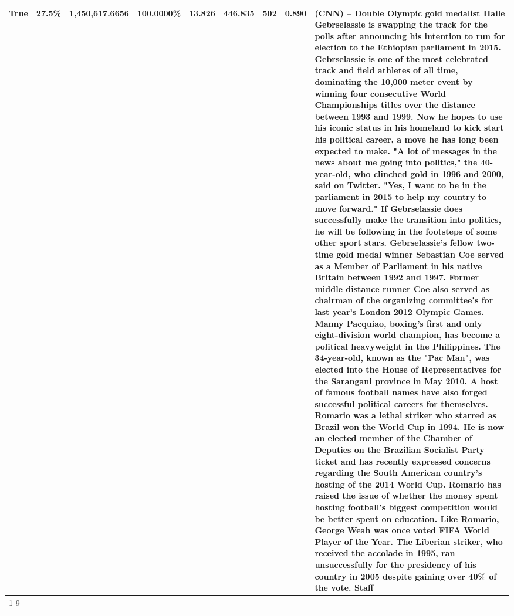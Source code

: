 \begin{table}[H]
{\begin{tabular}{lllrlllll}
True & 27.5\% & 1,450,617.6656 & \bfseries \color{red} 100.0000\% & 13.826 & 446.835 & 502 & 0.890 & (CNN) -- Double Olympic gold medalist Haile Gebrselassie is swapping the track for the polls after announcing his intention to run for election to the Ethiopian parliament in 2015. Gebrselassie is one of the most celebrated track and field athletes of all time, dominating the 10,000 meter event by winning four consecutive World Championships titles over the distance between 1993 and 1999. Now he hopes to use his iconic status in his homeland to kick start his political career, a move he has long been expected to make. "A lot of messages in the news about me going into politics," the 40-year-old, who clinched gold in 1996 and 2000, said on Twitter. "Yes, I want to be in the parliament in 2015 to help my country to move forward." If Gebrselassie does successfully make the transition into politics, he will be following in the footsteps of some other sport stars. Gebrselassie's fellow two-time gold medal winner Sebastian Coe served as a Member of Parliament in his native Britain between 1992 and 1997. Former middle distance runner Coe also served as chairman of the organizing committee's for last year's London 2012 Olympic Games. Manny Pacquiao, boxing's first and only eight-division world champion, has become a political heavyweight in the Philippines. The 34-year-old, known as the "Pac Man", was elected into the House of Representatives for the Sarangani province in May 2010. A host of famous football names have also forged successful political careers for themselves. Romario was a lethal striker who starred as Brazil won the World Cup in 1994. He is now an elected member of the Chamber of Deputies on the Brazilian Socialist Party ticket and has recently expressed concerns regarding the South American country's hosting of the 2014 World Cup. Romario has raised the issue of whether the money spent hosting football's biggest competition would be better spent on education. Like Romario, George Weah was once voted FIFA World Player of the Year. The Liberian striker, who received the accolade in 1995, ran unsuccessfully for the presidency of his country in 2005 despite gaining over 40\% of the vote. Staff \\
\cline{1-9}

\end{tabular}}
\end{table}
